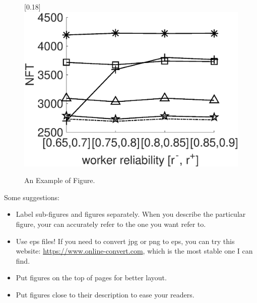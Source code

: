 \begin{figure}[th!]
{		\scalebox{0.18}[0.18]{\includegraphics{../figures/example.eps}}
		\label{subfig:sub_example7}}
	\figureCaptionMargin
	\caption{\small An Example of Figure.}\figureBelowMargin\vspace{-2ex}
	\label{fig:example3}
\end{figure}

Some suggestions:
\begin{itemize}[leftmargin=*]
	\item Label sub-figures and figures separately. When you describe the particular figure, your can accurately refer to the one you want refer to.
	\item Use eps files! If you need to convert jpg or png to eps, you can try this website: \url{https://www.online-convert.com}, which is the most stable one I can find.
	\item Put figures on the top of pages for better layout. 
	\item Put figures close to their description to ease your readers.
\end{itemize}


